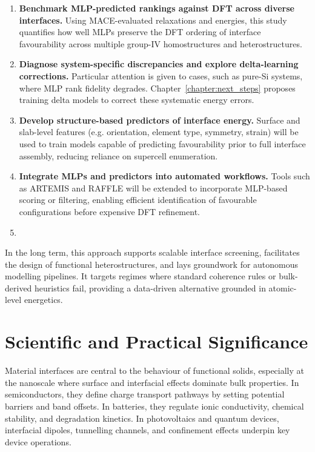 \begin{enumerate}
    \item \textbf{Benchmark MLP-predicted rankings against DFT across diverse interfaces.} Using MACE-evaluated relaxations and energies, this study quantifies how well MLPs preserve the DFT ordering of interface favourability across multiple group-IV homostructures and heterostructures.
    \item \textbf{Diagnose system-specific discrepancies and explore delta-learning corrections.} Particular attention is given to cases, such as pure-Si systems, where MLP rank fidelity degrades. Chapter~\ref{chapter:next_steps} proposes training delta models to correct these systematic energy errors.
    \item \textbf{Develop structure-based predictors of interface energy.} Surface and slab-level features (e.g. orientation, element type, symmetry, strain) will be used to train models capable of predicting favourability prior to full interface assembly, reducing reliance on supercell enumeration.
    \item \textbf{Integrate MLPs and predictors into automated workflows.} Tools such as ARTEMIS and RAFFLE will be extended to incorporate MLP-based scoring or filtering, enabling efficient identification of favourable configurations before expensive DFT refinement.
\item \end{enumerate}

In the long term, this approach supports scalable interface screening, facilitates the design of functional heterostructures, and lays groundwork for autonomous modelling pipelines. It targets regimes where standard coherence rules or bulk-derived heuristics fail, providing a data-driven alternative grounded in atomic-level energetics.
\section{Scientific and Practical Significance} \label{section:scientific_and_practical_significance}

Material interfaces are central to the behaviour of functional solids, especially at the nanoscale where surface and interfacial effects dominate bulk properties. In semiconductors, they define charge transport pathways by setting potential barriers and band offsets. In batteries, they regulate ionic conductivity, chemical stability, and degradation kinetics. In photovoltaics and quantum devices, interfacial dipoles, tunnelling channels, and confinement effects underpin key device operations.

